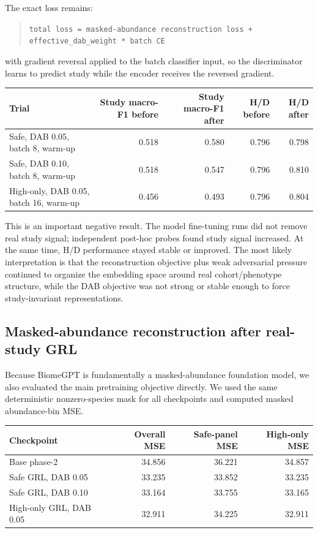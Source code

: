 \documentclass[11pt]{article}
\newcommand{\code}[1]{\texttt{\small #1}}
\begin{document}
The exact loss remains:

\begin{quote}
\code{total loss = masked-abundance reconstruction loss + effective\_dab\_weight * batch CE}
\end{quote}

with gradient reversal applied to the batch classifier input, so the discriminator learns
to predict study while the encoder receives the reversed gradient.

\begin{center}
\begin{tabular}{lrrrr}
\toprule
Trial & Study macro-F1 before & Study macro-F1 after & H/D before & H/D after \\
\midrule
Safe, DAB 0.05, batch 8, warm-up & 0.518 & 0.580 & 0.796 & 0.798 \\
Safe, DAB 0.10, batch 8, warm-up & 0.518 & 0.547 & 0.796 & 0.810 \\
High-only, DAB 0.05, batch 16, warm-up & 0.456 & 0.493 & 0.796 & 0.804 \\
\bottomrule
\end{tabular}
\end{center}

This is an important negative result. The model fine-tuning runs did not remove real
study signal; independent post-hoc probes found study signal increased. At the same time,
H/D performance stayed stable or improved. The most likely interpretation is that the
reconstruction objective plus weak adversarial pressure continued to organize the
embedding space around real cohort/phenotype structure, while the DAB objective was not
strong or stable enough to force study-invariant representations.

\subsection{Masked-abundance reconstruction after real-study GRL}

Because BiomeGPT is fundamentally a masked-abundance foundation model, we also evaluated
the main pretraining objective directly. We used the same deterministic nonzero-species
mask for all checkpoints and computed masked abundance-bin MSE.

\begin{center}
\begin{tabular}{lrrr}
\toprule
Checkpoint & Overall MSE & Safe-panel MSE & High-only MSE \\
\midrule
Base phase-2 & 34.856 & 36.221 & 34.857 \\
Safe GRL, DAB 0.05 & 33.235 & 33.852 & 33.235 \\
Safe GRL, DAB 0.10 & 33.164 & 33.755 & 33.165 \\
High-only GRL, DAB 0.05 & 32.911 & 34.225 & 32.911 \\
\bottomrule
\end{tabular}
\end{center}
\end{document}
